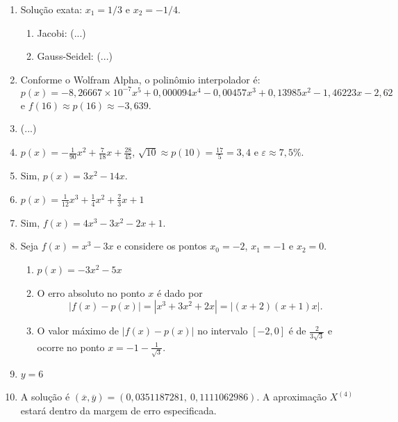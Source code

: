 \documentclass[12pt,a4paper]{article}
\newcommand{\fixme}{{\color{red}(...)}}
\begin{document}
\begin{enumerate}
\item Solução exata: $x_1 = 1/3$ e $x_2 = -1/4$.
\begin{enumerate}
\item Jacobi: \fixme
\item Gauss-Seidel: \fixme
\end{enumerate}
\item Conforme o Wolfram Alpha, o polinômio interpolador é:
\[
p(x) = -8,\!26667 \times 10^{-7} x^5 + 0,\!000094 x^4 - 0,\!00457 x^3 + 0,\!13985 x^2 - 1,\!46223 x - 2,\!62
\]
e $f(16) \approx p(16) \approx -3,\!639$.
\item \fixme
\item $p(x) = -\frac{1}{90}x^2 + \frac{7}{18} x + \frac{28}{45}$, $\sqrt{10} \approx p(10) = \frac{17}{5} = 3,\!4$ e $\varepsilon \approx 7,\!5\%$.
\item Sim, $p(x) = 3x^2 - 14x$.
\item $p(x) = \frac{1}{12}x^3 + \frac{1}{4}x^2 + \frac{2}{3} x + 1$
\item Sim, $f(x) = 4x^3 - 3x^2 - 2x + 1$.
\item Seja $f(x) = x^3 - 3x$ e considere os pontos $x_0 = -2$, $x_1 = -1$ e $x_2 = 0$.
\begin{enumerate}
\item $p(x) = -3x^2 - 5x$
\item O erro absoluto no ponto $x$ é dado por
\[
|f(x) - p(x)| = |x^3 + 3x^2 + 2x| = |(x + 2) (x + 1) x|.
\]

\item O valor máximo de $|f(x) - p(x)|$ no intervalo $[-2, 0]$ é de $\frac{2}{3 \sqrt{3}}$ e ocorre no ponto $x = -1 - \frac{1}{\sqrt{3}}$.
\end{enumerate}
\item $y=6$
\item A solução é $(\overline{x},\overline{y}) = (0,0351187281,\ 0,1111062986)$. A aproximação $X^{(4)}$ estará dentro da margem de erro especificada.
\end{enumerate}
\end{document}
